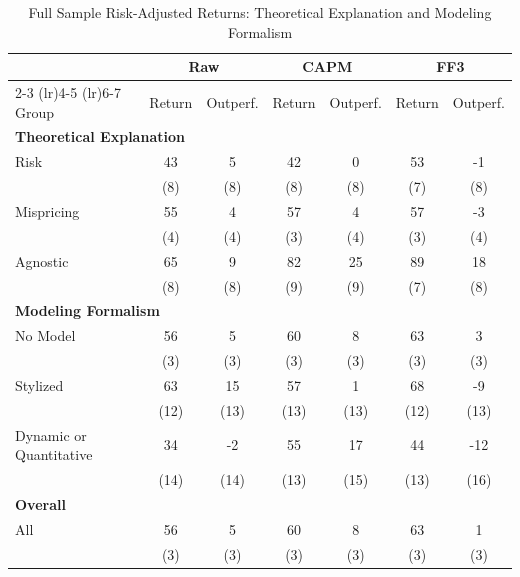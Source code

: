 \begin{table}[htbp]
\centering
\small
\caption{Full Sample Risk-Adjusted Returns: Theoretical Explanation and Modeling Formalism}
\label{tab:risk_adjusted_fs}
\setlength{\tabcolsep}{0.4ex}

\begin{tabular}{lcccccc}
\toprule
  & \multicolumn{2}{c}{Raw} & \multicolumn{2}{c}{CAPM} & \multicolumn{2}{c}{FF3}
\\
\cmidrule(lr){2-3} \cmidrule(lr){4-5} \cmidrule(lr){6-7}
Group & Return & Outperf. & Return & Outperf. & Return & Outperf.
\\
\midrule
\multicolumn{7}{l}{\textbf{Theoretical Explanation}}\\
\addlinespace[2pt]
Risk & 43 & 5 & 42 & 0 & 53 & -1
\\
 & (8) & (8) & (8) & (8) & (7) & (8)
\\[2pt]
Mispricing & 55 & 4 & 57 & 4 & 57 & -3
\\
 & (4) & (4) & (3) & (4) & (3) & (4)
\\[2pt]
Agnostic & 65 & 9 & 82 & 25 & 89 & 18
\\
 & (8) & (8) & (9) & (9) & (7) & (8)
\\[2pt]
\multicolumn{7}{l}{\textbf{Modeling Formalism}}\\
\addlinespace[2pt]
No Model & 56 & 5 & 60 & 8 & 63 & 3
\\
 & (3) & (3) & (3) & (3) & (3) & (3)
\\[2pt]
Stylized & 63 & 15 & 57 & 1 & 68 & -9
\\
 & (12) & (13) & (13) & (13) & (12) & (13)
\\[2pt]
Dynamic or Quantitative & 34 & -2 & 55 & 17 & 44 & -12
\\
 & (14) & (14) & (13) & (15) & (13) & (16)
\\[2pt]
\multicolumn{7}{l}{\textbf{Overall}}\\
\addlinespace[2pt]
All & 56 & 5 & 60 & 8 & 63 & 1
\\
 & (3) & (3) & (3) & (3) & (3) & (3)
\\[2pt]
\bottomrule
\end{tabular}
\end{table}
